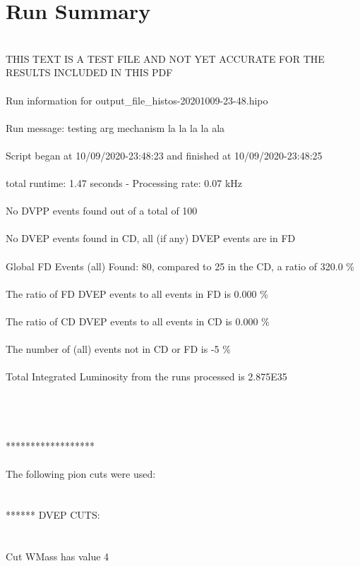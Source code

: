 \documentclass{article}
\begin{document}
\section{Run Summary}

	
\\THIS TEXT IS A TEST FILE AND NOT YET ACCURATE FOR THE RESULTS INCLUDED IN THIS PDF \\
\\Run information for output\_file\_histos-20201009-23-48.hipo \\
\\Run message: testing arg mechanism la la la la ala   \\
\\Script began at 10/09/2020-23:48:23 and finished at 10/09/2020-23:48:25  \\
\\total runtime: 1.47 seconds - Processing rate: 0.07 kHz   \\
\\No DVPP events found out of a total of 100   \\
\\ No DVEP events found in CD, all (if any) DVEP events are in FD   \\
\\Global FD Events (all) Found: 80, compared to 25 in the CD, a ratio of 320.0 \%  \\
\\The ratio of FD DVEP events to all events in FD is  0.000 \%  \\
\\The ratio of CD DVEP events to all events in CD is  0.000 \%  \\
\\The number of (all) events not in CD or FD is  -5 \%  \\
\\Total Integrated Luminosity from the runs processed is 2.875E35   \\
\\
\\ 
\\
\\****************** \\
\\ The following pion cuts were used: \\
\\
\\ ****** DVEP CUTS: \\
\\ 
\\Cut WMass has value 4 \\
\end{document}
